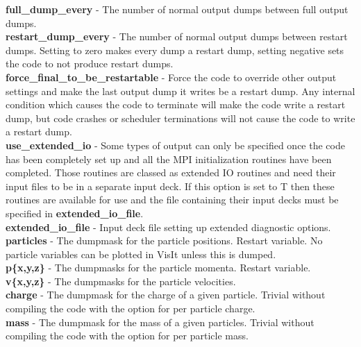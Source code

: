 \documentclass[12pt]{article}
\newcommand{\emphtext}{\color{warwickdark} \fontfamily{phv}\selectfont\Large\bf}
\newcommand{\inlineemph}{\color{warwicklight} \bf}
\begin{document}
{\emphtext full\_dump\_every} - The number of normal output dumps between full
output dumps.\\

{\emphtext restart\_dump\_every} - The number of normal output dumps between
restart dumps. Setting to zero makes every dump a restart dump, setting
negative sets the code to not produce restart dumps.\\

{\emphtext force\_final\_to\_be\_restartable} - Force the code to override
other output settings and make the last output dump it writes be a restart
dump. Any internal condition which causes the code to terminate will make the
code write a restart dump, but code crashes or scheduler terminations will not
cause the code to write a restart dump.\\

{\emphtext use\_extended\_io} - Some types of output can only be specified once
the code has been completely set up and all the MPI initialization routines
have been completed. Those routines are classed as extended IO routines and
need their input files to be in a separate input deck. If this option is set to
T then these routines are available for use and the file containing their input
decks must be specified in {\inlineemph extended\_io\_file}.\\

{\emphtext extended\_io\_file} - Input deck file setting up extended diagnostic
options.\\

{\emphtext particles} - The dumpmask for the particle positions. Restart
variable. No particle variables can be plotted in VisIt unless this is
dumped.\\

{\emphtext p\{x,y,z\}} - The dumpmasks for the particle momenta. Restart
variable.\\

{\emphtext v\{x,y,z\}} - The dumpmasks for the particle velocities.\\

{\emphtext charge} - The dumpmask for the charge of a given particle. Trivial
without compiling the code with the option for per particle charge.\\

{\emphtext mass} - The dumpmask for the mass of a given particles. Trivial
without compiling the code with the option for per particle mass.\\
\end{document}
